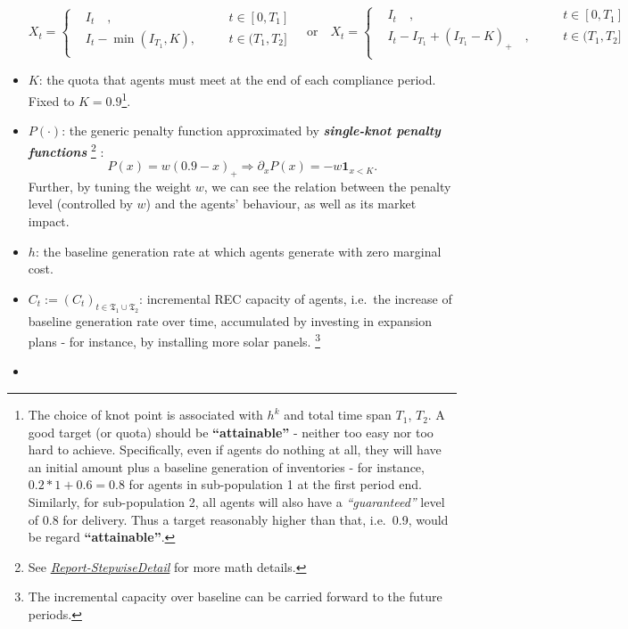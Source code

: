 \documentclass[a4paper,10pt]{article}
\newcommand{\1}{\mathbf{1}}
\begin{document}
\begin{itemize}
  \[
    X_t=
    \begin{cases}
        & I_t\quad,                  \quad&& t \in [0,T_1]\\
        & I_t- \min(I_{T_1},K), \quad&& t \in (T_1,T_2]\\
    \end{cases} 
    \quad\text{or}\quad
    X_t=
    \begin{cases}
        & I_t\quad,                                           \quad&& t \in [0,T_1]\\
        & I_t-I_{T_1}+(I_{T_1}-K)_+\quad, \quad&& t \in (T_1,T_2]\\
    \end{cases} 
    \]
\item
  \(K\): the quota that agents must meet at the end of each compliance
  period. Fixed to \(K=0.9\)\footnote{The choice of knot point is
    associated with \(h^{k}\) and total time span \(T_1\), \(T_2\). A
    good target (or quota) should be \textbf{``attainable''} - neither
    too easy nor too hard to achieve. Specifically, even if agents do
    nothing at all, they will have an initial amount plus a baseline
    generation of inventories - for instance, \(0.2*1 + 0.6=0.8\) for
    agents in sub-population 1 at the first period end. Similarly, for
    sub-population 2, all agents will also have a \emph{``guaranteed''}
    level of 0.8 for delivery. Thus a target reasonably higher than
    that, i.e.~0.9, would be regard \textbf{``attainable''}.}.
\item
  \(P(\cdot)\): the generic penalty function approximated by
  \emph{\textbf{single-knot penalty functions}} \footnote{See
    \href{../FinalReports/Report-StepwiseDetail.md}{\emph{Report-StepwiseDetail}}
    for more math details.} :
  \[P(x)=w(0.9-x)_+ \Rightarrow\partial_{x}P(x) = - w\mathbf{1}_{x<K}.\]
  Further, by tuning the weight \(w\), we can see the relation between
  the penalty level (controlled by \(w\)) and the agents' behaviour, as
  well as its market impact.
\item
  \(h\): the baseline generation rate at which agents generate with zero
  marginal cost.
\item
  \(C_t := (C_t)_{t\in\mathfrak{T_1} \cup \mathfrak{T_2}}\): incremental
  REC capacity of agents, i.e.~the increase of baseline generation rate
  over time, accumulated by investing in expansion plans - for instance,
  by installing more solar panels. \footnote{The incremental capacity
    over baseline can be carried forward to the future periods.}
\item

\end{itemize}
\end{document}
